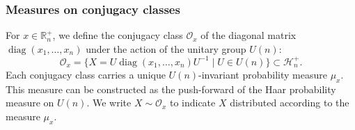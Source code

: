 \documentclass[pdflatex, sn-mathphys-num]{sn-jnl} %
\theoremstyle{plain}
\theoremstyle{definition}
\DeclareMathOperator{\diag}{diag}
\newcommand{\orbit}{\mathcal O}
\newcommand{\hermp}[1]{\mathcal H^{+}_{#1}}
\newcommand{\eigsp}[1]{\mathbb R^{+}_{#1}}
\begin{document}
\subsubsection{Measures on conjugacy classes}
For $x \in \eigsp{n}$, we define the conjugacy class $\orbit_x$ of the diagonal matrix
$\diag(x_1, \ldots, x_n)$ under the action of the unitary group $U(n)$:
\begin{equation}
    \orbit_x = \{ X = U\diag(x_1, \ldots, x_n)U^{-1} \mid U \in U(n)\} \subset \hermp{n}.
\end{equation}
Each conjugacy class carries a unique $U(n)$-invariant probability measure $\mu_x$.
This measure can be constructed as the push-forward of the Haar probability measure on $U(n)$.
We write $X \sim \orbit_x$ to indicate $X$ distributed according to the measure $\mu_x$.
\end{document}
